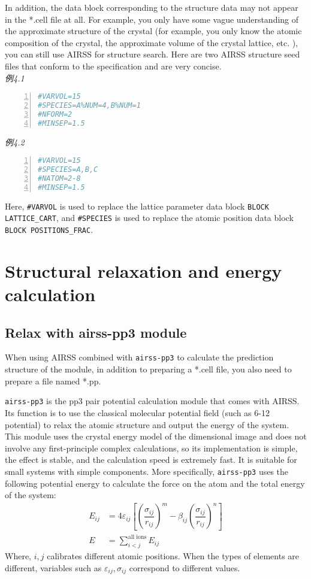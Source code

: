 \documentclass[a4paper, 10pt]{article}
\begin{document}
In addition, the data block corresponding to the structure data may not appear in the *.cell file at all. For example, you only have some vague understanding of the approximate structure of the crystal (for example, you only know the atomic composition of the crystal, the approximate volume of the crystal lattice, etc. ), you can still use AIRSS for structure search. Here are two AIRSS structure seed files that conform to the specification and are very concise.\\
\emph{例4.1}
\begin{lstlisting}[language={bash},numbers=left]
#VARVOL=15
#SPECIES=A%NUM=4,B%NUM=1
#NFORM=2 
#MINSEP=1.5
\end{lstlisting}
\emph{例4.2}
\begin{lstlisting}[language={bash},numbers=left]
#VARVOL=15 
#SPECIES=A,B,C
#NATOM=2-8
#MINSEP=1.5        
\end{lstlisting}

Here, \verb|#VARVOL| is used to replace the lattice parameter data block \verb|BLOCK LATTICE_CART|, and \verb|#SPECIES| is used to replace the atomic position data block \verb|BLOCK POSITIONS_FRAC|.

\newpage
\section{Structural relaxation and energy calculation}

\subsection{Relax with airss-pp3 module}
When using AIRSS combined with \verb|airss-pp3| to calculate the prediction structure of the module, in addition to preparing a *.cell file, you also need to prepare a file named *.pp.

\verb|airss-pp3| is the pp3 pair potential calculation module that comes with AIRSS. Its function is to use the classical molecular potential field (such as 6-12 potential) to relax the atomic structure and output the energy of the system. This module uses the crystal energy model of the dimensional image and does not involve any first-principle complex calculations, so its implementation is simple, the effect is stable, and the calculation speed is extremely fast. It is suitable for small systems with simple components. More specifically, \verb|airss-pp3| uses the following potential energy to calculate the force on the atom and the total energy of the system:
\begin{subequations}
  \label{eq:pp3}
  \begin{align}
    E_{ij} &= 4\varepsilon_{ij}\left[\left(\dfrac{\sigma_{ij}}{r_{ij}}\right)^m -\beta_{ij}\left(\dfrac{\sigma_{ij}}{r_{ij}}\right)^n\right]\\
    E &= \sum_{i<j}^{\text{all ions}} E_{ij}
  \end{align}
\end{subequations}
Where, \(i,j\) calibrates different atomic positions. When the types of elements are different, variables such as \(\varepsilon_{ij},\sigma_{ij}\) correspond to different values.
\end{document}
